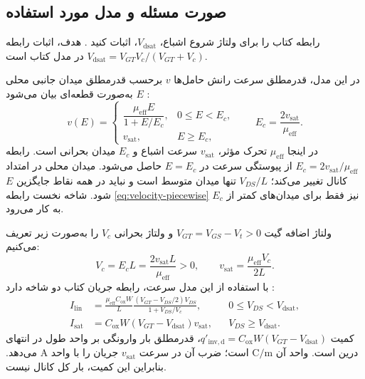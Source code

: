 \subsection*{صورت مسئله و مدل مورد استفاده}
رابطه  کتاب را برای ولتاژ شروع اشباع، \(V_{\mathrm{dsat}}\)، اثبات کنید
\cite[تمرین ، صفحه چاپی ۹۶]{weste}.
هدف، اثبات رابطه
\(V_{\mathrm{dsat}}=V_{GT}V_c/(V_{GT}+V_c)\)
در مدل  کتاب است.

در این مدل، قدرمطلق سرعت رانش حامل‌ها \(v\) برحسب قدرمطلق میدان جانبی محلی \(E\) به‌صورت قطعه‌ای بیان می‌شود
\cite[روابط  و ، صفحه چاپی ۷۶]{weste}\cite[اسلاید ۹]{nonideal}:
\begin{equation}
 v(E)=
 \begin{cases}
 \dfrac{\mu_{\mathrm{eff}}E}{1+E/E_c},&0\le E<E_c,\\[4pt]
 v_{\mathrm{sat}},&E\ge E_c,
 \end{cases}
 \qquad E_c=\frac{2v_{\mathrm{sat}}}{\mu_{\mathrm{eff}}}.
 \label{eq:velocity-piecewise}
\end{equation}
در اینجا \(\mu_{\mathrm{eff}}\) تحرک مؤثر، \(v_{\mathrm{sat}}\) سرعت اشباع و \(E_c\) میدان بحرانی است.
رابطه \(E_c=2v_{\mathrm{sat}}/\mu_{\mathrm{eff}}\) از پیوستگی سرعت در \(E=E_c\) حاصل می‌شود.
میدان محلی در امتداد کانال تغییر می‌کند؛ \(V_{DS}/L\) تنها میدان متوسط است و نباید در همه نقاط جایگزین \(E\) شود.
شاخه نخست رابطه \eqref{eq:velocity-piecewise} نیز فقط برای میدان‌های کمتر از \(E_c\) به کار می‌رود.

ولتاژ اضافه گیت \(V_{GT}=V_{GS}-V_t>0\) و ولتاژ بحرانی \(V_c\) را به‌صورت زیر تعریف می‌کنیم:
\begin{equation}
 V_c=E_cL=\frac{2v_{\mathrm{sat}}L}{\mu_{\mathrm{eff}}}>0,
 \qquad v_{\mathrm{sat}}=\frac{\mu_{\mathrm{eff}}V_c}{2L}.
 \label{eq:velocity-critical-voltage}
\end{equation}
با استفاده از این مدل سرعت، رابطه جریان کتاب دو شاخه دارد
\cite[رابطه ، صفحه چاپی ۷۷]{weste}:
\begin{align}
 I_{\mathrm{lin}}&=\frac{\mu_{\mathrm{eff}}C_{\mathrm{ox}}W}{L}
 \frac{(V_{GT}-V_{DS}/2)V_{DS}}{1+V_{DS}/V_c},
 &&0\le V_{DS}<V_{\mathrm{dsat}},
 \label{eq:velocity-linear}\\
 I_{\mathrm{sat}}&=C_{\mathrm{ox}}W(V_{GT}-V_{\mathrm{dsat}})v_{\mathrm{sat}},
 &&V_{DS}\ge V_{\mathrm{dsat}}.
 \label{eq:velocity-saturation}
\end{align}
کمیت \(q'_{\mathrm{inv,d}}=C_{\mathrm{ox}}W(V_{GT}-V_{\mathrm{dsat}})\)، قدرمطلق بار وارونگی بر واحد طول در انتهای درین است.
واحد آن \(\unit{\coulomb\per\metre}\) است؛ ضرب آن در سرعت \(v_{\mathrm{sat}}\) جریان را با واحد \(\unit{\ampere}\) می‌دهد.
بنابراین این کمیت، بار کل کانال نیست.

